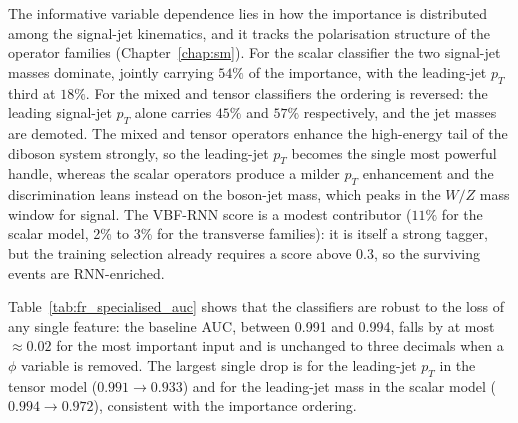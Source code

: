The informative variable dependence lies in how the importance is distributed among the signal-jet kinematics, and it tracks the polarisation structure of the operator families (Chapter~\ref{chap:sm}). For the scalar classifier the two signal-jet masses dominate, jointly carrying $54\%$ of the importance, with the leading-jet $p_T$ third at $18\%$. For the mixed and tensor classifiers the ordering is reversed: the leading signal-jet $p_T$ alone carries $45\%$ and $57\%$ respectively, and the jet masses are demoted. The mixed and tensor operators enhance the high-energy tail of the diboson system strongly, so the leading-jet $p_T$ becomes the single most powerful handle, whereas the scalar operators produce a milder $p_T$ enhancement and the discrimination leans instead on the boson-jet mass, which peaks in the $W/Z$ mass window for signal. The VBF-RNN score is a modest contributor ($11\%$ for the scalar model, 2\% to 3\% for the transverse families): it is itself a strong tagger, but the training selection already requires a score above $0.3$, so the surviving events are RNN-enriched.

Table~\ref{tab:fr_specialised_auc} shows that the classifiers are robust to the loss of any single feature: the baseline AUC, between 0.991 and 0.994, falls by at most $\approx0.02$ for the most important input and is unchanged to three decimals when a $\phi$ variable is removed. The largest single drop is for the leading-jet $p_T$ in the tensor model ($0.991\to0.933$) and for the leading-jet mass in the scalar model ($0.994\to0.972$), consistent with the importance ordering.

